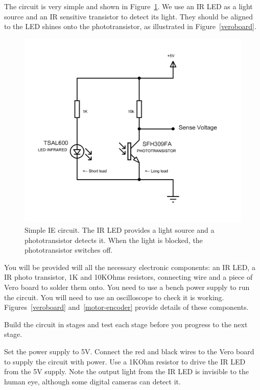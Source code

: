 \documentclass{instructions}
\begin{document}

The circuit is very simple and shown in Figure~\ref{circuit}. We use an IR LED
as a light source and an IR sensitive transistor to detect its light. They
should be aligned to the LED shines onto the phototransistor, as illustrated in
Figure~\ref{veroboard}. 


\begin{figure}
    \centering
    \includegraphics[width=0.7\linewidth]{encoder-001}
    \caption{Simple  IE  circuit.  The  IR  LED  provides  a  light  source  and
    a phototransistor  detects  it.  When  the  light  is  blocked,  the
    phototransistor switches off.}
    \label{circuit}
\end{figure}

You  will  be  provided  will  all  the  necessary  electronic  components: an
IR LED, a IR photo transistor, 1K and 10KOhms resistors, connecting wire and a
piece of Vero board to solder them onto. You need to use a bench power supply to
run the circuit. You will need to use an oscilloscope to check it is working.
Figures~\ref{veroboard} and~\ref{motor-encoder} provide details of these
components. 


Build the circuit in stages and test each stage before you progress to the next
stage. 


Set  the  power  supply  to  5V.  Connect the red  and  black  wires  to  the Vero
board to supply the circuit with power. Use a 1KOhm resistor to drive the IR
LED from the 5V supply. Note the output light from the IR LED is invisible to
the human eye, although some digital cameras can detect it. 
\end{document}
